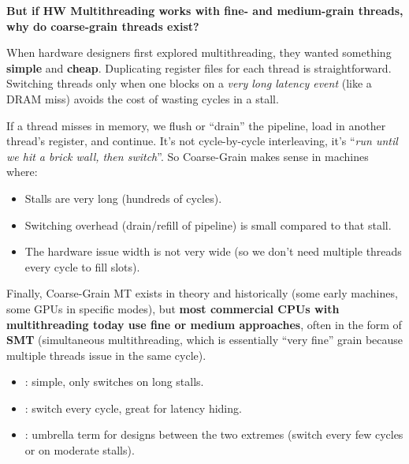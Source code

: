 \highspace
\begin{flushleft}
    \textcolor{Green3}{ \textbf{But if HW Multithreading works with fine- and medium-grain threads, why do coarse-grain threads exist?}}
\end{flushleft}
When hardware designers first explored multithreading, they wanted something \textbf{simple} and \textbf{cheap}. Duplicating register files for each thread is straightforward. Switching threads only when one blocks on a \emph{very long latency event} (like a DRAM miss) avoids the cost of wasting cycles in a stall.

\highspace
If a thread misses in memory, we flush or ``drain'' the pipeline, load in another thread's register, and continue. It's not cycle-by-cycle interleaving, it's ``\emph{run until we hit a brick wall, then switch}''. So Coarse-Grain makes sense in machines where:
\begin{itemize}
    \item Stalls are very long (hundreds of cycles).
    \item Switching overhead (drain/refill of pipeline) is small compared to that stall.
    \item The hardware issue width is not very wide (so we don't need multiple threads every cycle to fill slots).
\end{itemize}
Finally, Coarse-Grain MT exists in theory and historically (some early machines, some GPUs in specific modes), but \textbf{most commercial CPUs with multithreading today use fine or medium approaches}, often in the form of \textbf{SMT} (simultaneous multithreading, which is essentially ``very fine'' grain because multiple threads issue in the same cycle).
\begin{itemize}
    \item {}: simple, only switches on long stalls.
    \item {}: switch every cycle, great for latency hiding.
    \item {}: umbrella term for designs between the two extremes (switch every few cycles or on moderate stalls).
\end{itemize}

\newpage

